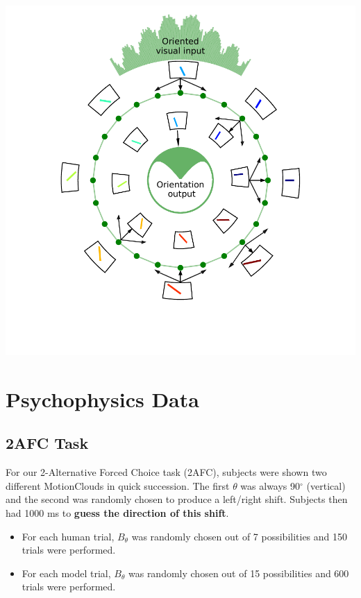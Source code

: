 \documentclass[a0,portrait]{a0poster}
\begin{document}
\begin{multicols}{3}
\includegraphics[width=1\linewidth]{Fig_ring_model.pdf}

\section*{Psychophysics Data}
\subsection*{2AFC Task}
For our 2-Alternative Forced Choice task (2AFC), subjects were shown two different MotionClouds in quick succession. The first $\theta$ was always 90$^\circ$ (vertical) and the second was randomly chosen to produce a left/right shift. Subjects then had 1000 ms to \textbf{guess the direction of this shift}.
\begin{itemize}
\item For each human trial, $B_\theta$ was randomly chosen out of 7 possibilities and 150 trials were performed.
\item For each model trial, $B_\theta$ was randomly chosen out of 15 possibilities and 600 trials were performed.
\end{itemize}


\end{multicols}
\end{document}
